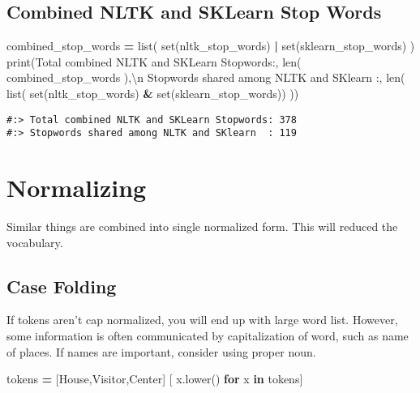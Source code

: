 \documentclass[
]{book}
\newenvironment{Shaded}{\begin{snugshade}}{\end{snugshade}}
\newcommand{\BuiltInTok}[1]{#1}
\newcommand{\CharTok}[1]{\textcolor[rgb]{0.5,0.5,0.5}{#1}}
\newcommand{\ControlFlowTok}[1]{\textcolor[rgb]{0.27,0.27,0.27}{\textbf{#1}}}
\newcommand{\KeywordTok}[1]{\textcolor[rgb]{0.27,0.27,0.27}{\textbf{#1}}}
\newcommand{\NormalTok}[1]{#1}
\newcommand{\OperatorTok}[1]{\textcolor[rgb]{0.43,0.43,0.43}{\textbf{#1}}}
\newcommand{\StringTok}[1]{\textcolor[rgb]{0.5,0.5,0.5}{#1}}
\begin{document}
\hypertarget{combined-nltk-and-sklearn-stop-words}{%
\subsection{Combined NLTK and SKLearn Stop Words}\label{combined-nltk-and-sklearn-stop-words}}

\begin{Shaded}
\begin{Highlighting}[]
\NormalTok{combined\_stop\_words }\OperatorTok{=} \BuiltInTok{list}\NormalTok{( }\BuiltInTok{set}\NormalTok{(nltk\_stop\_words) }\OperatorTok{|} \BuiltInTok{set}\NormalTok{(sklearn\_stop\_words) )}
\BuiltInTok{print}\NormalTok{(}\StringTok{\textquotesingle{}Total combined NLTK and SKLearn Stopwords:\textquotesingle{}}\NormalTok{, }\BuiltInTok{len}\NormalTok{( combined\_stop\_words ),}\StringTok{\textquotesingle{}}\CharTok{\textbackslash{}n}\StringTok{\textquotesingle{}}
      \StringTok{\textquotesingle{}Stopwords shared among NLTK and SKlearn  :\textquotesingle{}}\NormalTok{, }\BuiltInTok{len}\NormalTok{( }\BuiltInTok{list}\NormalTok{( }\BuiltInTok{set}\NormalTok{(nltk\_stop\_words) }\OperatorTok{\&} \BuiltInTok{set}\NormalTok{(sklearn\_stop\_words)) ))}
\end{Highlighting}
\end{Shaded}

\begin{verbatim}
#:> Total combined NLTK and SKLearn Stopwords: 378 
#:> Stopwords shared among NLTK and SKlearn  : 119
\end{verbatim}

\hypertarget{normalizing}{%
\section{Normalizing}\label{normalizing}}

Similar things are combined into single normalized form. This will reduced the vocabulary.

\hypertarget{case-folding}{%
\subsection{Case Folding}\label{case-folding}}

If tokens aren't cap normalized, you will end up with large word list. However, some information is often communicated by capitalization of word, such as name of places. If names are important, consider using proper noun.

\begin{Shaded}
\begin{Highlighting}[]
\NormalTok{tokens }\OperatorTok{=}\NormalTok{ [}\StringTok{\textquotesingle{}House\textquotesingle{}}\NormalTok{,}\StringTok{\textquotesingle{}Visitor\textquotesingle{}}\NormalTok{,}\StringTok{\textquotesingle{}Center\textquotesingle{}}\NormalTok{]}
\NormalTok{[ x.lower() }\ControlFlowTok{for}\NormalTok{ x }\KeywordTok{in}\NormalTok{ tokens]}
\end{Highlighting}
\end{Shaded}
\end{document}
